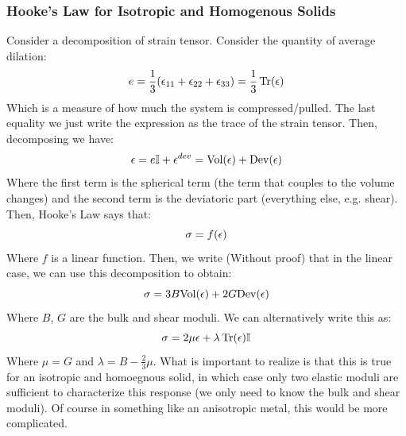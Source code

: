 \documentclass[../PHYS306Notes.tex]{subfiles}
\begin{document}
\subsubsection{Hooke's Law for Isotropic and Homogenous Solids}
Consider a decomposition of strain tensor. Consider the quantity of average dilation:
\[e = \frac{1}{3}(\epsilon_{11} + \epsilon_{22} + \epsilon_{33}) = \frac{1}{3}\Tr(\epsilon)\]
Which is a measure of how much the system is compressed/pulled. The last equality we just write the expression as the trace of the strain tensor. Then, decomposing we have:
\[\epsilon = e\mathbb{I} + \epsilon^{dev} = \text{Vol}(\epsilon) + \text{Dev}(\epsilon)\]
Where the first term is the spherical term (the term that couples to the volume changes) and the second term is the deviatoric part (everything else, e.g. shear). Then, Hooke's Law says that:
\[\sigma = f(\epsilon)\]
Where $f$ is a linear function. Then, we write (Without proof) that in the linear case, we can use this decomposition to obtain:
\[\sigma = 3B\text{Vol}(\epsilon) + 2G\text{Dev}(\epsilon)\]
Where $B$, $G$ are the bulk and shear moduli. We can alternatively write this as:
\[\sigma = 2\mu\epsilon + \lambda \Tr(\epsilon) \mathbb{I}\]
Where $\mu = G$ and $\lambda = B - \frac{2}{3}\mu$. What is important to realize is that this is true for an isotropic and homoegnous solid, in which case only two elastic moduli are sufficient to characterize this response (we only need to know the bulk and shear moduli). Of course in something like an anisotropic metal, this would be more complicated.
\end{document}
